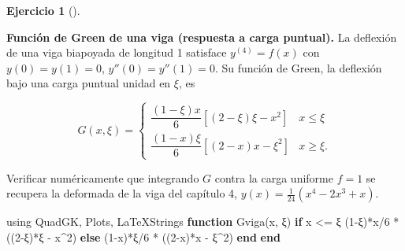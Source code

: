 \documentclass[
  spanish,
  a4paper,
]{scrreport}
\newenvironment{Shaded}{\begin{snugshade}}{\end{snugshade}}
\newcommand{\BuiltInTok}[1]{\textcolor[rgb]{0.00,0.23,0.31}{#1}}
\newcommand{\ControlFlowTok}[1]{\textcolor[rgb]{0.00,0.23,0.31}{\textbf{#1}}}
\newcommand{\FloatTok}[1]{\textcolor[rgb]{0.68,0.00,0.00}{#1}}
\newcommand{\FunctionTok}[1]{\textcolor[rgb]{0.28,0.35,0.67}{#1}}
\newcommand{\ImportTok}[1]{\textcolor[rgb]{0.00,0.46,0.62}{#1}}
\newcommand{\KeywordTok}[1]{\textcolor[rgb]{0.00,0.23,0.31}{\textbf{#1}}}
\newcommand{\NormalTok}[1]{\textcolor[rgb]{0.00,0.23,0.31}{#1}}
\newcommand{\OperatorTok}[1]{\textcolor[rgb]{0.37,0.37,0.37}{#1}}
\theoremstyle{definition}
\newtheorem{exercise}{Ejercicio}[chapter]
\theoremstyle{remark}
\begin{document}
\begin{exercise}[]\protect\hypertarget{exr-green-viga}{}\label{exr-green-viga}

\textbf{Función de Green de una viga (respuesta a carga puntual).} La
deflexión de una viga biapoyada de longitud 1 satisface
\(y^{(4)} = f(x)\) con \(y(0)=y(1)=0\), \(y''(0)=y''(1)=0\). Su función
de Green, la deflexión bajo una carga puntual unidad en \(\xi\), es

\[
G(x, \xi) = \begin{cases}
\dfrac{(1-\xi)x}{6}\left[(2-\xi)\xi - x^2\right] & x \le \xi \\[2mm]
\dfrac{(1-x)\xi}{6}\left[(2-x)x - \xi^2\right] & x \ge \xi.
\end{cases}
\]

Verificar numéricamente que integrando \(G\) contra la carga uniforme
\(f = 1\) se recupera la deformada de la viga del capítulo 4,
\(y(x) = \frac{1}{24}(x^4 - 2x^3 + x)\).

\begin{tcolorbox}[enhanced jigsaw, arc=.35mm, bottomrule=.15mm, bottomtitle=1mm, breakable, colback=white, colbacktitle=quarto-callout-tip-color!10!white, colframe=quarto-callout-tip-color-frame, coltitle=black, left=2mm, leftrule=.75mm, opacityback=0, opacitybacktitle=0.6, rightrule=.15mm, title=\textcolor{quarto-callout-tip-color}{\faLightbulb}\hspace{0.5em}{Solución}, titlerule=0mm, toprule=.15mm, toptitle=1mm]

\begin{Shaded}
\begin{Highlighting}[]
\ImportTok{using} \BuiltInTok{QuadGK}\NormalTok{, }\BuiltInTok{Plots}\NormalTok{, }\BuiltInTok{LaTeXStrings}
\KeywordTok{function} \FunctionTok{Gviga}\NormalTok{(x, ξ)}
    \ControlFlowTok{if}\NormalTok{ x }\OperatorTok{\textless{}=}\NormalTok{ ξ}
\NormalTok{        (}\FloatTok{1}\OperatorTok{{-}}\NormalTok{ξ)}\OperatorTok{*}\NormalTok{x}\OperatorTok{/}\FloatTok{6} \OperatorTok{*}\NormalTok{ ((}\FloatTok{2}\OperatorTok{{-}}\NormalTok{ξ)}\OperatorTok{*}\NormalTok{ξ }\OperatorTok{{-}}\NormalTok{ x}\OperatorTok{\^{}}\FloatTok{2}\NormalTok{)}
    \ControlFlowTok{else}
\NormalTok{        (}\FloatTok{1}\OperatorTok{{-}}\NormalTok{x)}\OperatorTok{*}\NormalTok{ξ}\OperatorTok{/}\FloatTok{6} \OperatorTok{*}\NormalTok{ ((}\FloatTok{2}\OperatorTok{{-}}\NormalTok{x)}\OperatorTok{*}\NormalTok{x }\OperatorTok{{-}}\NormalTok{ ξ}\OperatorTok{\^{}}\FloatTok{2}\NormalTok{)}
    \ControlFlowTok{end}
\KeywordTok{end}


\end{Highlighting}
\end{Shaded}
\end{tcolorbox}
\end{exercise}
\end{document}
